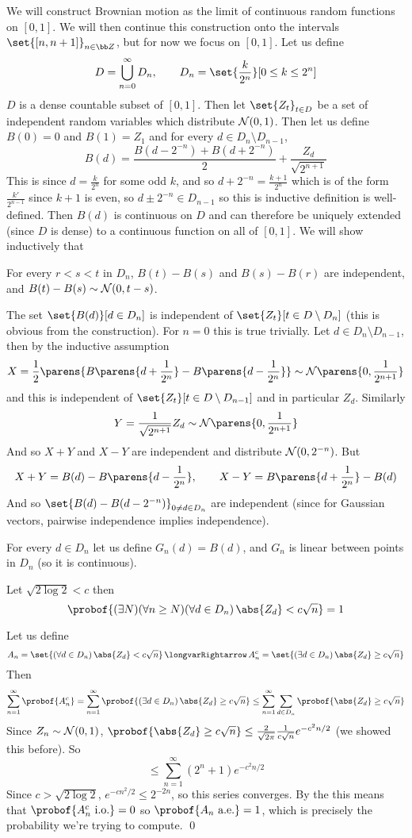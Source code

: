 We will construct Brownian motion as the limit of continuous random functions on $[0,1]$.
We will then continue this construction onto the intervals $\set{[n,n+1]}_{n\in{\bb Z}}$, but for now we focus on $[0,1]$.
Let us define
$$ D = \bigcup_{n=0}^\infty D_n,\qquad D_n = \set{\frac k{2^n}}[0\leq k\leq 2^n] $$
$D$ is a dense countable subset of $[0,1]$.
Then let $\set{Z_t}_{t\in D}$ be a set of independent random variables which distribute ${\cal N}(0,1)$.
Then let us define $B(0)=0$ and $B(1)=Z_1$ and for every $d\in D_n\setminus D_{n-1}$,
$$ B(d) = \frac{B(d-2^{-n}) + B(d+2^{-n})}2 + \frac{Z_d}{\sqrt{2^{n+1}}} $$
This is since $d=\frac k{2^n}$ for some odd $k$, and so $d+2^{-n}=\frac{k+1}{2^n}$ which is of the form $\frac{k'}{2^{n-1}}$ since $k+1$ is even, so $d\pm2^{-n}\in D_{n-1}$ so this is inductive definition
is well-defined.
Then $B(d)$ is continuous on $D$ and can therefore be uniquely extended (since $D$ is dense) to a continuous function on all of $[0,1]$.
We will show inductively that
\benum
    \item For every $r<s<t$ in $D_n$, $B(t)-B(s)$ and $B(s)-B(r)$ are independent, and $B(t)-B(s)\sim{\cal N}(0,t-s)$.
    \item The set $\set{B(d)}[d\in D_n]$ is independent of $\set{Z_t}[t\in D\setminus D_n]$ (this is obvious from the construction).
\eenum
For $n=0$ this is true trivially.
Let $d\in D_n\setminus D_{n-1}$, then by the inductive assumption
$$ X = \frac12\parens{B\parens{d+\frac1{2^n}}-B\parens{d-\frac1{2^n}}}\sim{\cal N}\parens{0,\frac1{2^{n+1}}} $$
and this is independent of $\set{Z_t}[t\in D\setminus D_{n-1}]$ and in particular $Z_d$.
Similarly
$$ Y = \frac1{\sqrt{2^{n+1}}}Z_d \sim {\cal N}\parens{0,\frac1{2^{n+1}}} $$
And so $X+Y$ and $X-Y$ are independent and distribute ${\cal N}(0,2^{-n})$.
But
$$ X + Y = B(d) - B\parens{d-\frac1{2^n}},\qquad X - Y = B\parens{d+\frac1{2^n}} - B(d) $$
And so $\set{B(d)-B(d-2^{-n})}_{0\neq d\in D_n}$ are independent (since for Gaussian vectors, pairwise independence implies independence).

For every $d\in D_n$ let us define $G_n(d)=B(d)$, and $G_n$ is linear between points in $D_n$ (so it is continuous).

\blemm

    Let $\sqrt{2\log 2}<c$ then
    $$ \probof{(\exists N)(\forall n\geq N)(\forall d\in D_n)\,\abs{Z_d}<c\sqrt n} = 1 $$

\elemm

Let us define
$$ A_n = \set{(\forall d\in D_n)\, \abs{Z_d}<c\sqrt n}\implies A_n^c = \set{(\exists d\in D_n)\, \abs{Z_d}\geq c\sqrt n} $$
Then
$$ \sum_{n=1}^\infty \probof{A_n^c} = \sum_{n=1}^\infty \probof{(\exists d\in D_n)\, \abs{Z_d}\geq c\sqrt n} \leq \sum_{n=1}^\infty\sum_{d\in D_n}\probof{\abs{Z_d}\geq c\sqrt n} $$
Since $Z_n\sim{\cal N}(0,1)$, $\probof{\abs{Z_d}\geq c\sqrt n}\leq\frac2{\sqrt{2\pi}}\frac1{c\sqrt n}e^{-c^2n/2}$ (we showed this before).
So
$$ \leq \sum_{n=1}^\infty(2^n+1)e^{-c^2n/2} $$
Since $c>\sqrt{2\log2}$, $e^{-cn^2/2}\leq 2^{-2n}$, so this series converges.
By the  this means that $\probof{A_n^c\hbox{ i.o.}}=0$ so $\probof{A_n\hbox{ a.e.}}=1$, which is precisely the probability we're trying to compute.
\qed

